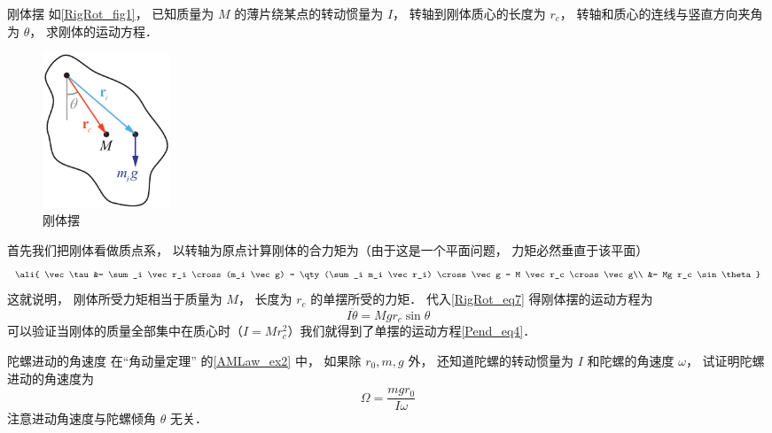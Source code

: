 \begin{exam}{刚体摆}\label{RigRot_ex1}
如\autoref{RigRot_fig1}， 已知质量为 $M$ 的薄片绕某点的转动惯量为 $I$， 转轴到刚体质心的长度为 $r_c$， 转轴和质心的连线与竖直方向夹角为 $\theta$， 求刚体的运动方程．
\begin{figure}[ht]
\centering
\includegraphics[width=3.8cm]{./figures/RigRot1.pdf}
\caption{刚体摆} \label{RigRot_fig1}
\end{figure}

首先我们把刚体看做质点系， 以转轴为原点计算刚体的合力矩为（由于这是一个平面问题， 力矩必然垂直于该平面）
\begin{equation}\ali{
\vec \tau &= \sum_i \vec r_i \cross (m_i \vec g)
= \qty(\sum_i m_i \vec r_i) \cross \vec g
= M \vec r_c \cross \vec g\\
&= Mg r_c \sin\theta
}\end{equation}
这就说明， 刚体所受力矩相当于质量为 $M$， 长度为 $r_c$ 的单摆所受的力矩． 代入\autoref{RigRot_eq7} 得刚体摆的运动方程为
\begin{equation}
I\ddot \theta = Mg r_c \sin\theta
\end{equation}
可以验证当刚体的质量全部集中在质心时（$I = Mr_c^2$）我们就得到了单摆的运动方程\autoref{Pend_eq4}．
\end{exam}

\begin{exer}{陀螺进动的角速度}
在“角动量定理” 的\autoref{AMLaw_ex2} 中， 如果除 $r_0, m, g$ 外， 还知道陀螺的转动惯量为 $I$ 和陀螺的角速度 $\omega$， 试证明陀螺进动的角速度为
\begin{equation}
\Omega = \frac{mgr_0}{I\omega}
\end{equation}
注意进动角速度与陀螺倾角 $\theta$ 无关．
\end{exer}










